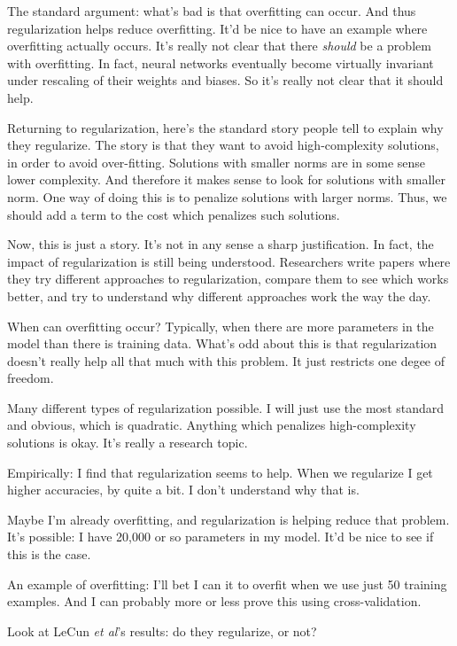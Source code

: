 \documentclass[12pt]{article}
\begin{document}
The standard argument: what's bad is that overfitting can occur.  And
thus regularization helps reduce overfitting.  It'd be nice to have an
example where overfitting actually occurs.  It's really not clear that
there \emph{should} be a problem with overfitting.  In fact, neural
networks eventually become virtually invariant under rescaling of
their weights and biases.  So it's really not clear that it should
help.

Returning to regularization, here's the standard story people tell to
explain why they regularize.  The story is that they want to avoid
high-complexity solutions, in order to avoid over-fitting.  Solutions
with smaller norms are in some sense lower complexity.  And therefore
it makes sense to look for solutions with smaller norm.  One way of
doing this is to penalize solutions with larger norms.  Thus, we
should add a term to the cost which penalizes such solutions.

Now, this is just a story.  It's not in any sense a sharp
justification.  In fact, the impact of regularization is still being
understood.  Researchers write papers where they try different
approaches to regularization, compare them to see which works better,
and try to understand why different approaches work the way the day.

When can overfitting occur?  Typically, when there are more parameters
in the model than there is training data.  What's odd about this is
that regularization doesn't really help all that much with this
problem.  It just restricts one degee of freedom.

Many different types of regularization possible.  I will just use the
most standard and obvious, which is quadratic.  Anything which
penalizes high-complexity solutions is okay.  It's really a research
topic.

Empirically: I find that regularization seems to help.  When we
regularize I get higher accuracies, by quite a bit.  I don't
understand why that is.

Maybe I'm already overfitting, and regularization is helping reduce
that problem.  It's possible: I have 20,000 or so parameters in my
model.  It'd be nice to see if this is the case.

An example of overfitting: I'll bet I can it to overfit when we use
just 50 training examples.  And I can probably more or less prove this
using cross-validation.

Look at LeCun \emph{et al}'s results: do they regularize, or not?
\end{document}
